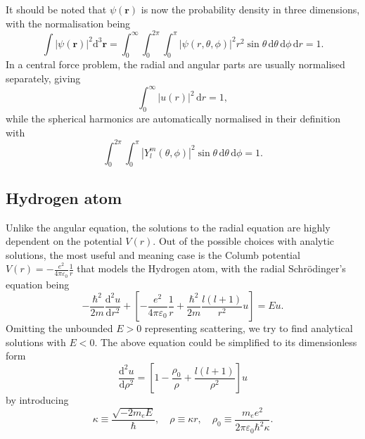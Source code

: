 \documentclass{article}
\theoremstyle{nonumberplain}
\begin{document}
It should be noted that $\psi (\mathbf{r})$ is now the probability density in three dimensions, with the normalisation being 
\[
    \int \left\vert \psi (\mathbf{r} ) \right\vert ^{2} \mathrm{d}^3 \mathbf{r} = 
    \int_{0}^{\infty} \int_{0}^{2\pi } \int_{0}^{\pi } \left\vert \psi (r,\theta ,\phi ) \right\vert ^{2} r^{2} \sin \theta  \,\mathrm{d}\theta   \,\mathrm{d}\phi   \,\mathrm{d}r = 1.  
\]
In a central force problem, the radial and angular parts are usually normalised separately, giving 
\[
    \boxed{ 
        \int_{0}^{\infty} \left\vert u(r) \right\vert ^{2}  \,\mathrm{d}r = 1, 
    }
\]
while the spherical harmonics are automatically normalised in their definition with 
\[
    \int_{0}^{2\pi } \int_{0}^{\pi } \left\vert Y_l^m(\theta ,\phi ) \right\vert^{2}   \sin \theta  \,\mathrm{d}\theta   \,\mathrm{d}\phi  =1. 
\]
\subsection{Hydrogen atom}
Unlike the angular equation, the solutions to the radial equation are highly dependent on the potential $V(r).$ Out of the possible choices with analytic solutions, the most useful and meaning case is the Columb potential $V(r) = -\frac{e^2}{4\pi \varepsilon_0}\frac{1}{r}$ that models the Hydrogen atom, with the radial Schrödinger's equation being 
\[
    -\frac{\hbar ^{2} }{2 m } \frac{\mathrm{d}^{2} u}{\mathrm{d}r^{2} } + \left[ 
        -\frac{e^2}{4\pi \varepsilon_0}\frac{1}{r} + \frac{\hbar ^{2} }{2m } \frac{l(l+1)}{r^{2} }u 
        \right]
        = E u. 
\]
Omitting the unbounded $E>0$ representing scattering, we try to find analytical solutions with $E<0$. The above equation could be simplified to its dimensionless form 
\begin{equation} 
    \label{eq:Culumb-SE}
    \frac{\mathrm{d}^{2} u}{\mathrm{d}\rho ^{2} } = \left[ 
        1 - \frac{\rho _0}{\rho } + \frac{l(l+1)}{\rho ^{2} }
    \right] u
\end{equation}
by introducing 
\[
    \kappa \equiv \frac{\sqrt{-2 m_e E} }{\hbar }, \quad 
    \rho  \equiv \kappa  r, \quad 
    \rho _0 \equiv \frac{m_e e^{2} }{2 \pi \varepsilon_0 \hbar ^{2} \kappa }. 
\] 
\end{document}
